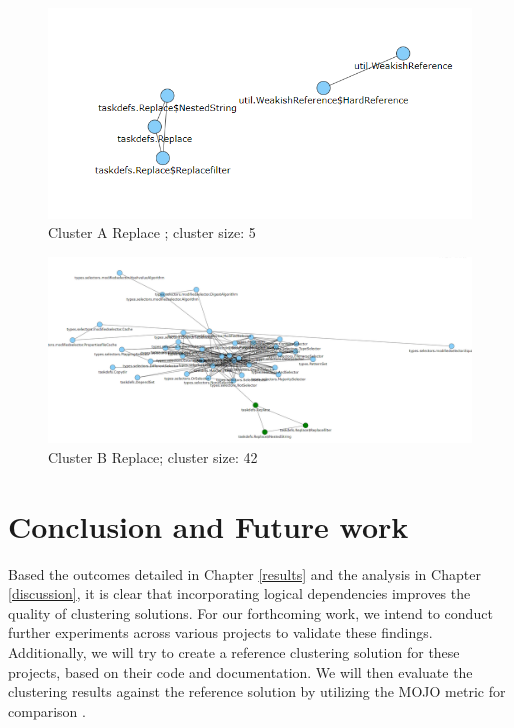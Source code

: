 \documentclass[conference]{IEEEtran}
\begin{document}
\begin{figure}
\centering
\includegraphics[width=\columnwidth]{cluster_replaceSD.PNG}
\caption{Cluster A Replace ; cluster size: 5}
\label{fig:clusterAreplace}
\centering
\end{figure}


\begin{figure}
\centering
\includegraphics[width=\columnwidth]{cluster_replaceSDLD.PNG}
\caption{Cluster B Replace; cluster size: 42}
\label{fig:clusterBreplace}
\centering
\end{figure}

\section{Conclusion and Future work}

Based the outcomes detailed in Chapter \ref{results} and the analysis in Chapter \ref{discussion}, it is clear that incorporating logical dependencies improves the quality of clustering solutions. For our forthcoming work, we intend to conduct further experiments across various projects to validate these findings. Additionally, we will try to create a reference clustering solution for these projects, based on their code and documentation. We will then evaluate the clustering results against the reference solution by utilizing the MOJO metric for comparison \cite{mojo-tzerpos}.




\end{document}
